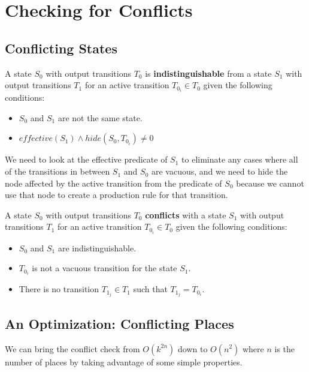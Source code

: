 \section{Checking for Conflicts}

\subsection{Conflicting States}

\begin{definition}
A state $S_0$ with output transitions $T_0$ is \textbf{indistinguishable} from a state $S_1$ with output transitions $T_1$ for an active transition $T_{0_i} \in T_0$ given the following conditions:
\begin{itemize}
\item $S_0$ and $S_1$ are not the same state.
\item $effective(S_1) \wedge hide(S_0, T_{0_i}) \ne 0$
\end{itemize}
\end{definition}

We need to look at the effective predicate of $S_1$ to eliminate any cases where all of the transitions in between $S_1$ and $S_0$ are vacuous, and we need to hide the node affected by the active transition from the predicate of $S_0$ because we cannot use that node to create a production rule for that transition.

\begin{definition}
A state $S_0$ with output transitions $T_0$ \textbf{conflicts} with a state $S_1$ with output transitions $T_1$ for an active transition $T_{0_i} \in T_0$ given the following conditions:
\begin{itemize}
\item $S_0$ and $S_1$ are indistinguishable.
\item $T_{0_i}$ is not a vacuous transition for the state $S_1$.
\item There is no transition $T_{1_j} \in T_1$ such that $T_{1_j} = T_{0_i}$.
\end{itemize}
\end{definition}

\subsection{An Optimization: Conflicting Places}

We can bring the conflict check from $O(k^{2n})$ down to $O(n^2)$ where $n$ is the number of places by taking advantage of some simple properties.

